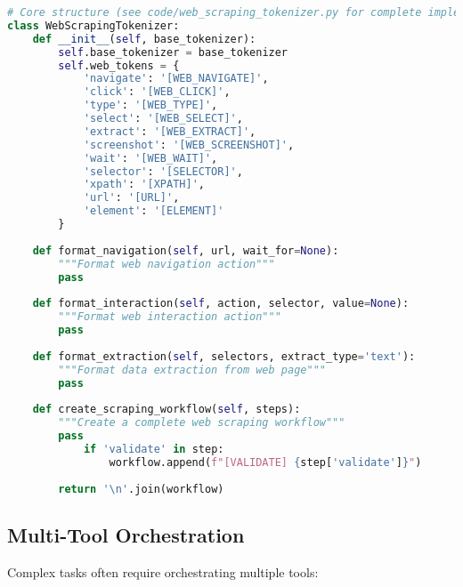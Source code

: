 \begin{lstlisting}[language=Python, caption=Web scraping and browser automation tokens]
# Core structure (see code/web_scraping_tokenizer.py for complete implementation)
class WebScrapingTokenizer:
    def __init__(self, base_tokenizer):
        self.base_tokenizer = base_tokenizer
        self.web_tokens = {
            'navigate': '[WEB_NAVIGATE]',
            'click': '[WEB_CLICK]',
            'type': '[WEB_TYPE]',
            'select': '[WEB_SELECT]',
            'extract': '[WEB_EXTRACT]',
            'screenshot': '[WEB_SCREENSHOT]',
            'wait': '[WEB_WAIT]',
            'selector': '[SELECTOR]',
            'xpath': '[XPATH]',
            'url': '[URL]',
            'element': '[ELEMENT]'
        }
    
    def format_navigation(self, url, wait_for=None):
        """Format web navigation action"""
        pass
    
    def format_interaction(self, action, selector, value=None):
        """Format web interaction action"""
        pass
    
    def format_extraction(self, selectors, extract_type='text'):
        """Format data extraction from web page"""
        pass
    
    def create_scraping_workflow(self, steps):
        """Create a complete web scraping workflow"""
        pass
            if 'validate' in step:
                workflow.append(f"[VALIDATE] {step['validate']}")
        
        return '\n'.join(workflow)
\end{lstlisting}

\subsection{Multi-Tool Orchestration}

Complex tasks often require orchestrating multiple tools:

